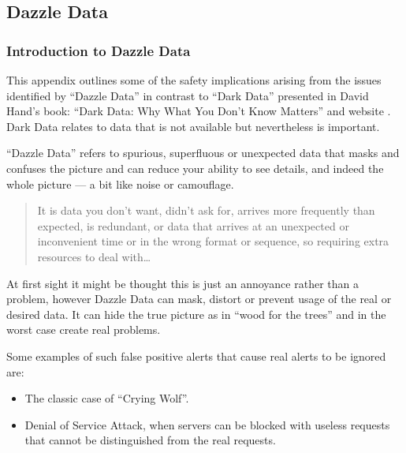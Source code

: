 \subsection{Dazzle Data} \label{bkm:dazzledata}
%



\subsubsection{Introduction to Dazzle Data}
This appendix outlines some of the safety implications arising from the issues identified by
``Dazzle Data'' in contrast to ``Dark Data'' presented in David Hand's book:
``Dark Data: Why What You Don't Know Matters'' \cite{citation:darkdata:hand}
and website \cite{citation:darkdata:website}.
Dark Data relates to data that is not available but nevertheless is important.

``Dazzle Data'' refers to spurious, superfluous or unexpected data that masks and confuses the picture and can reduce your ability to see details, and indeed the whole picture --- a bit like noise or camouflage.

\begin{quote}
  It is data you don't want, didn't ask for, arrives more frequently than expected, is redundant, or data that arrives at an unexpected or inconvenient time or in the wrong format or sequence, so requiring extra resources to deal with\dots
\end{quote}

At first sight it might be thought this is just an annoyance rather than a problem,
however Dazzle Data can mask, distort or prevent usage of the real or desired data.
It can hide the true picture as in ``wood for the trees'' and in the worst case create real problems. 

Some examples of such false positive alerts that cause real alerts to be ignored are:
\begin{itemize}
  \item The classic case of ``Crying Wolf''.
  \item Denial of Service Attack, when servers can be blocked with useless requests that cannot be distinguished from the real requests.
\end{itemize}

